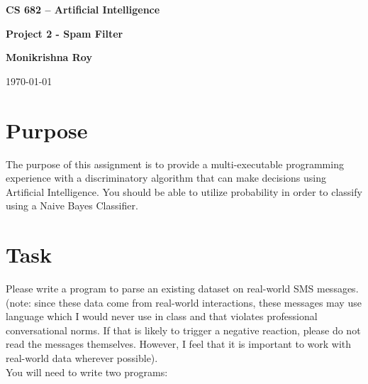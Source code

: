 \documentclass[twoside,10pt]{article}
\begin{document}
\begin{center}
    {\Large \bf CS 682 – Artificial Intelligence}

    \vspace{.5cm}

    {\Large \bf Project 2 - Spam Filter}

    \vspace{0.5cm}
    {\large \bf Monikrishna Roy}
    \vspace{0.5cm}

    {\large \today}

\end{center}

\section*{Purpose}\label{purpose}

The purpose of this assignment is to provide a multi-executable
programming experience with a discriminatory algorithm that can make
decisions using Artificial Intelligence. You should be able to utilize
probability in order to classify using a Naive Bayes Classifier.

\section*{Task}\label{task}

Please write a program to parse an existing dataset on real-world SMS
messages. (note: since these data come from real-world interactions,
these messages may use language which I would never use in class and
that violates professional conversational norms. If that is likely to
trigger a negative reaction, please do not read the messages themselves.
However, I feel that it is important to work with real-world data
wherever possible).\\

You will need to write two programs:
\end{document}
